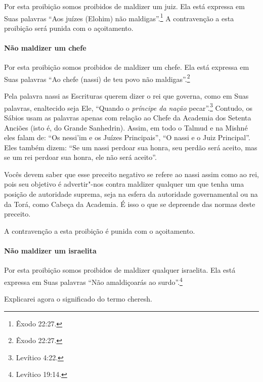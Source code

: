 \begin{multicols}{2}
Por esta proibição somos proibidos de maldizer um juiz. Ela está
expressa em Suas palavras ``Aos juízes (Elohim\starr) não maldigas''.\footnote{Êxodo
22:27.} A contravenção a esta proibição será punida com o açoitamento.

\paragraph{Não maldizer um chefe}

Por esta proibição somos proibidos de maldizer um chefe. Ela está
expressa em Suas palavras ``Ao chefe (nassi\starr) de teu povo não maldigas''.\footnote{Êxodo 22:27.}

Pela palavra nassi\starr{} as Escrituras querem dizer o
rei que governa, como em Suas palavras, enaltecido seja Ele, ``Quando o
\emph{príncipe da nação} pecar''.\footnote{Levítico 4:22.} Contudo, os Sábios
usam as palavras apenas com relação ao Chefe da Academia dos Setenta
Anciões (isto é, do Grande Sanhedrin\starr). Assim, em todo o Talmud\starr{} e na
Mishné eles falam de: ``Os nessi'im\starr{} e os Juízes Principais'', ``O
nassi\starr{} e o Juiz Principal''. Eles também dizem: ``Se um nassi\starr{} perdoar
sua honra, seu perdão será aceito, mas se um rei perdoar sua honra, ele
não será aceito''.

Vocês devem saber que esse preceito negativo se refere ao nassi\starr{} assim
como ao rei, pois seu objetivo é advertir"-nos contra maldizer qualquer
um que tenha uma posição de autoridade suprema, seja na esfera da
autoridade governamental ou na da Torá\starr, como Cabeça da Academia. É
isso o que se depreende das normas deste preceito.

A contravenção a esta proibição é punida com o açoitamento.

\paragraph{Não maldizer um israelita}

Por esta proibição somos proibidos de maldizer qualquer israelita. Ela
está expressa em Suas palavras ``Não amaldiçoarás ao surdo''.\footnote{Levítico
19:14.}

Explicarei agora o significado do termo cheresh\starr.


\end{multicols}
